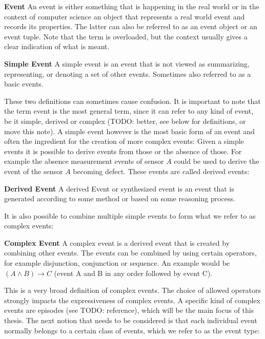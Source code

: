 \begin{mydef}
\textbf{Event} An event is either something that is happening in the real world or in the context of computer science an object that represents a real world event and records its properties. The latter can also be referred to as an event object or an event tuple. Note that the term is overloaded, but the context usually gives a clear indication of what is meant.
\end{mydef}

\begin{mydef}
\textbf{Simple Event} A simple event is an event that is not viewed as summarizing, representing, or denoting a set of other events. Sometimes also referred to as a basic events.
\end{mydef}

These two definitions can sometimes cause confusion. It is important to note that the term event is the most general term, since it can refer to any kind of event, be it simple, derived or complex (TODO: better, see below for definitions, or move this note). A simple event however is the most basic form of an event and often the ingredient for the creation of more complex events:
Given a simple events it is possible to derive events from those or the absence of those. For example the absence measurement events of sensor $A$ could be used to derive the event of the sensor $A$ becoming defect. These events are called derived events:

\begin{mydef}
\textbf{Derived Event} A derived Event or synthesized event is an event that is generated according to some method or based on some reasoning process.
\end{mydef}

It is also possible to combine multiple simple events to form what we refer to as complex events:

\begin{mydef}
\textbf{Complex Event} A complex event is a derived event that is created by combining other events. The events can be combined by using certain operators, for example disjunction, conjunction or sequence. An example would be $(A \land B) \rightarrow C$ (event A and B in any order followed by event C).
\end{mydef}

This is a very broad definition of complex events. The choice of allowed operators strongly impacts the expressiveness of complex events. A specific kind of complex events are episodes (see TODO: reference), which will be the main focus of this thesis.
The next notion that needs to be considered is that each individual event normally belongs to a certain class of events, which we refer to as the event type:

